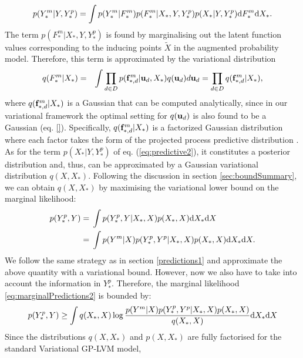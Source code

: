 
\begin{equation}
\label{eq:predictive2}
p(Y_*^m | Y, Y_*^p) =  \int p(Y_*^m | F_*^m)  p(F_*^m | X_*, Y, Y_*^p) p(X_*| Y, Y_*^p) \text{d}  F_*^m \text{d}  X_* .
\end{equation}
The term $p(F_*^m | X_*, Y, Y_*^p)$ is found by marginalising out the latent function values
corresponding to the inducing points $\tilde{X}$ in the augmented probability model. Therefore,
this term is approximated by the variational distribution
\begin{eqnarray}
\label{eq:qFstarXstar}
q(F_*^m |X_*) & = & \int \prod_{d \in D} p(\mathbf{f}_{*,d}^m | \mathbf{u}_d, X_*)  q(\mathbf{u}_d) d \mathbf{u}_d 
	    = \prod_{d \in D} q(\mathbf{f}_{*,d}^m | X_*)  ,
\end{eqnarray}
where $q(\mathbf{f}_{*,d}^m | X_*)$ is a Gaussian that can be computed analytically,
since in our variational framework the optimal setting for $q(\mathbf{u}_d)$ is also found 
to be a Gaussian (eq. \eqref{}).
Specifically, $q(\mathbf{f}_{*,d}^m | X_*)$
is a factorized Gaussian distribution
where each factor takes the form of the projected process predictive 
distribution \citep{Csato:sparse02,Seeger:fast03,Rasmussen:book06}.
As for the term $p(X_*| Y, Y_*^p)$ of eq. (\ref{eq:predictive2}), it constitutes a
posterior distribution and, thus, can be approximated by a Gaussian variational distribution $q(X,X_*)$.
Following the discussion in section \ref{sec:boundSummary}, we can obtain $q(X,X_*)$
by maximising the variational lower bound on the marginal likelihood:
\begin{align}
p(Y_*^p, Y) ={}&  \int p(Y_*^p, Y|X_*, X) p(X_*, X) \text{d}  X_* \text{d}  X \nonumber \\
={}&  \int p(Y^m | X) p(Y_*^p, Y^p|X_*, X) p(X_*, X) \text{d}  X_* \text{d}  X.  \label{eq:marginalPredictions2}
\end{align}
We follow the same strategy as in section \ref{predictions1} and approximate the above
quantity with a variational bound. However, now we also have to take into account the information
in $Y_*^p$. Therefore, the marginal likelihood \eqref{eq:marginalPredictions2} is bounded by:
\begin{equation}
\label{eq:predictiveMissing1a}
p(Y_*^p, Y) \geq \int q(X_*, X) \log \frac{ p(Y^m | X) 
    p(Y_*^p, Y^p|X_*, X) p(X_*,X)}{ q(X_*, X)} \text{d}  X_* \text{d}  X 
\end{equation}
Since the distributions $q(X,X_*)$ and $p(X,X_*)$ are fully factorised for the standard Variational GP-LVM model,
